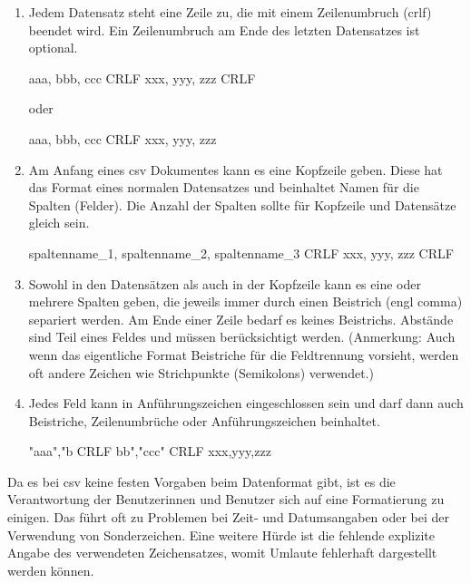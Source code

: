 \begin{enumerate}{}
	
	\item Jedem Datensatz steht eine Zeile zu, die mit einem Zeilenumbruch (\ac{crlf}) beendet wird. Ein Zeilenumbruch am Ende des letzten Datensatzes ist optional. \zB 
	\begin{textcode}
	aaa, bbb, ccc CRLF 
    xxx, yyy, zzz CRLF
	\end{textcode}
	oder
	\begin{textcode}
	aaa, bbb, ccc CRLF
	xxx, yyy, zzz
	\end{textcode}
	
	\item Am Anfang eines \ac{csv} Dokumentes kann es eine Kopfzeile geben. Diese hat das Format eines normalen Datensatzes und beinhaltet Namen für die Spalten (Felder). Die Anzahl der Spalten sollte für Kopfzeile und Datensätze gleich sein. \zB
	\begin{textcode}
	spaltenname_1, spaltenname_2, spaltenname_3 CRLF
	xxx, yyy, zzz CRLF
	\end{textcode}
	
	\item Sowohl in den Datensätzen als auch in der Kopfzeile kann es eine oder mehrere Spalten geben, die jeweils immer durch einen Beistrich (\ac{engl} comma) separiert werden. Am Ende einer Zeile bedarf es keines Beistrichs. Abstände sind Teil eines Feldes und müssen berücksichtigt werden. (Anmerkung: Auch wenn das eigentliche Format Beistriche für die Feldtrennung vorsieht, werden oft andere Zeichen wie \zB Strichpunkte (Semikolons) verwendet.)
	
	\item Jedes Feld kann in Anführungszeichen eingeschlossen sein und darf dann auch Beistriche, Zeilenumbrüche oder Anführungszeichen beinhaltet. \zB
	\begin{textcode}
	"aaa","b CRLF
	bb","ccc" CRLF
	xxx,yyy,zzz
	\end{textcode}
	
\end{enumerate}

Da es bei \ac{csv} keine festen Vorgaben beim Datenformat gibt, ist es die Verantwortung der Benutzerinnen und Benutzer sich auf eine Formatierung zu einigen. Das führt oft zu Problemen bei Zeit- und Datumsangaben oder bei der Verwendung von Sonderzeichen. Eine weitere Hürde ist die fehlende explizite Angabe des verwendeten Zeichensatzes, womit \zB Umlaute fehlerhaft dargestellt werden können. \cite[vgl.][]{FuchsMediaSolutions:o.J.}

